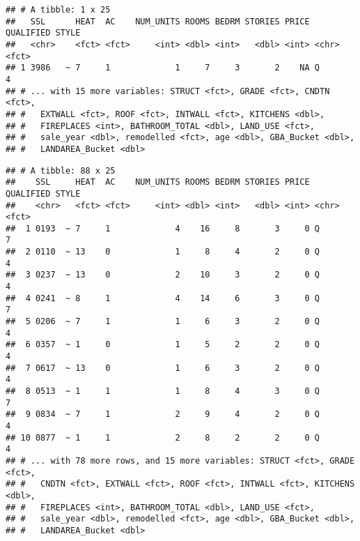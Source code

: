 \documentclass[]{article}
\newenvironment{Shaded}{\begin{snugshade}}{\end{snugshade}}
\newcommand{\DecValTok}[1]{\textcolor[rgb]{0.00,0.00,0.81}{#1}}
\newcommand{\KeywordTok}[1]{\textcolor[rgb]{0.13,0.29,0.53}{\textbf{#1}}}
\newcommand{\NormalTok}[1]{#1}
\newcommand{\OperatorTok}[1]{\textcolor[rgb]{0.81,0.36,0.00}{\textbf{#1}}}
\newcommand{\StringTok}[1]{\textcolor[rgb]{0.31,0.60,0.02}{#1}}
\begin{document}
\begin{verbatim}
## # A tibble: 1 x 25
##   SSL      HEAT  AC    NUM_UNITS ROOMS BEDRM STORIES PRICE QUALIFIED STYLE
##   <chr>    <fct> <fct>     <int> <dbl> <int>   <dbl> <int> <chr>     <fct>
## 1 3986   ~ 7     1             1     7     3       2    NA Q         4    
## # ... with 15 more variables: STRUCT <fct>, GRADE <fct>, CNDTN <fct>,
## #   EXTWALL <fct>, ROOF <fct>, INTWALL <fct>, KITCHENS <dbl>,
## #   FIREPLACES <int>, BATHROOM_TOTAL <dbl>, LAND_USE <fct>,
## #   sale_year <dbl>, remodelled <fct>, age <dbl>, GBA_Bucket <dbl>,
## #   LANDAREA_Bucket <dbl>
\end{verbatim}

\begin{Shaded}
\end{Shaded}

\begin{verbatim}
## # A tibble: 88 x 25
##    SSL     HEAT  AC    NUM_UNITS ROOMS BEDRM STORIES PRICE QUALIFIED STYLE
##    <chr>   <fct> <fct>     <int> <dbl> <int>   <dbl> <int> <chr>     <fct>
##  1 0193  ~ 7     1             4    16     8       3     0 Q         7    
##  2 0110  ~ 13    0             1     8     4       2     0 Q         4    
##  3 0237  ~ 13    0             2    10     3       2     0 Q         4    
##  4 0241  ~ 8     1             4    14     6       3     0 Q         7    
##  5 0206  ~ 7     1             1     6     3       2     0 Q         4    
##  6 0357  ~ 1     0             1     5     2       2     0 Q         4    
##  7 0617  ~ 13    0             1     6     3       2     0 Q         4    
##  8 0513  ~ 1     1             1     8     4       3     0 Q         7    
##  9 0834  ~ 7     1             2     9     4       2     0 Q         4    
## 10 0877  ~ 1     1             2     8     2       2     0 Q         4    
## # ... with 78 more rows, and 15 more variables: STRUCT <fct>, GRADE <fct>,
## #   CNDTN <fct>, EXTWALL <fct>, ROOF <fct>, INTWALL <fct>, KITCHENS <dbl>,
## #   FIREPLACES <int>, BATHROOM_TOTAL <dbl>, LAND_USE <fct>,
## #   sale_year <dbl>, remodelled <fct>, age <dbl>, GBA_Bucket <dbl>,
## #   LANDAREA_Bucket <dbl>
\end{verbatim}
\end{document}
